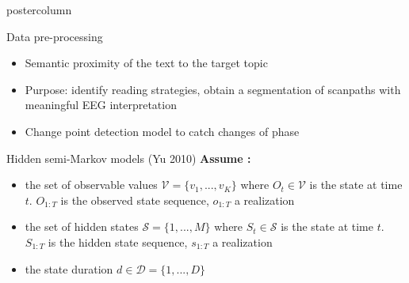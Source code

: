 \documentclass[final,hyperref={pdfpagelabels=false}]{beamer}
\begin{document}
\begin{frame}
\begin{columns}
\begin{column}{.49\textwidth}
\begin{beamercolorbox}[center,wd=\textwidth]{postercolumn}
\begin{minipage}[T]{.95\textwidth}
{\begin{block}{Data pre-processing}
\begin{minipage}{0.45\textwidth}
\begin{itemize}
\begin{itemize}
                            \item[\hookrightarrow] Semantic proximity of the text to the target topic
                        \end{itemize}
                    \end{itemize}
                \end{minipage}
                \begin{itemize}
                    \item[\bullet] Purpose: identify reading strategies, obtain a segmentation of scanpaths with meaningful EEG interpretation
                    \item[\hookrightarrow] Change point detection model to catch changes of phase
                \end{itemize}
            \end{block}
            \vfill
            \begin{block}{Hidden semi-Markov models (Yu 2010)}
                \textbf{Assume :}
                \vskip0.5cm
                \begin{itemize}
                    \item[\bullet] the set of observable values $\mathcal{V} = \{ v_1,..., v_K\}$
                    where $O_t \in \mathcal{V}$ is the state at time $t$. $O_{1:T}$ is the observed state sequence,
                    $o_{1:T}$ a realization
                    \item[\bullet] the set of hidden states $\mathcal{S}=\{1,...,M\}$
                    where $S_t \in \mathcal{S}$ is the state at time $t$. $S_{1:T}$ is the hidden state sequence,
                    $s_{1:T}$ a realization
                    \item[\bullet] the state duration $d \in \mathcal{D}=\{1,...,D\}$
                \end{itemize}


\end{block}}
\end{minipage}
\end{beamercolorbox}
\end{column}
\end{columns}
\end{frame}
\end{document}
